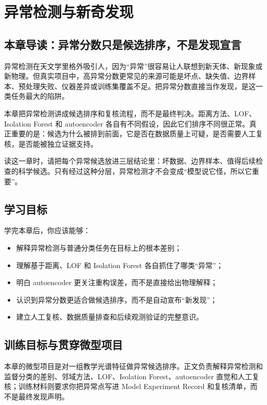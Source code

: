 \chapter{异常检测与新奇发现}

\section{本章导读：异常分数只是候选排序，不是发现宣言}

异常检测在天文学里格外吸引人，因为“异常”很容易让人联想到新天体、新现象或新物理。但真实项目中，高异常分数更常见的来源可能是坏点、缺失值、边界样本、预处理失败、仪器差异或训练集覆盖不足。把异常分数直接当作发现，是这一类任务最大的陷阱。

本章把异常检测讲成候选排序和复核流程，而不是最终判决。距离方法、LOF、Isolation Forest 和 autoencoder 各自有不同假设，因此它们排序不同很正常。真正重要的是：候选为什么被排到前面，它是否在数据质量上可疑，是否需要人工复核，是否能被独立证据支持。

读这一章时，请把每个异常候选放进三层结论里：坏数据、边界样本、值得后续检查的科学候选。只有经过这种分层，异常检测才不会变成“模型说它怪，所以它重要”。

\section{学习目标}

学完本章后，你应该能够：

\begin{itemize}
    \item 解释异常检测与普通分类任务在目标上的根本差别；
    \item 理解基于距离、LOF 和 Isolation Forest 各自抓住了哪类“异常”；
    \item 明白 autoencoder 更关注重构误差，而不是直接给出物理解释；
    \item 认识到异常分数更适合做候选排序，而不是自动宣布“新发现”；
    \item 建立人工复核、数据质量排查和后续观测验证的完整意识。
\end{itemize}

\section{训练目标与贯穿微型项目}

本章的微型项目是对一组教学光谱特征做异常候选排序。正文负责解释异常检测和监督分类的差别、邻域方法、LOF、Isolation Forest、autoencoder 直觉和人工复核；训练材料则要求你把异常点写进 Model Experiment Record 和复核清单，而不是最终发现声明。

